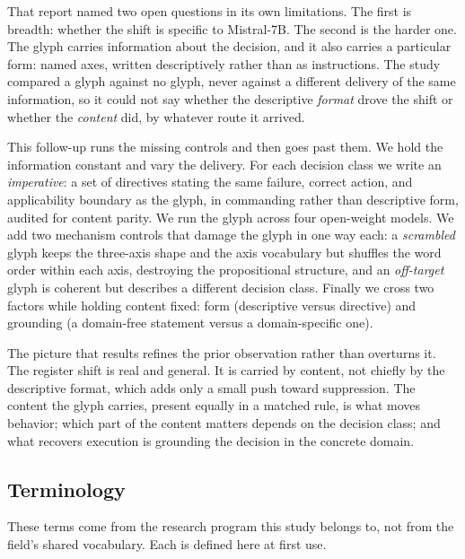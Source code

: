 \documentclass[11pt,a4paper]{article}
\begin{document}
That report named two open questions in its own limitations. The first is breadth:
whether the shift is specific to Mistral-7B. The second is the harder one. The glyph
carries information about the decision, and it also carries a particular form: named
axes, written descriptively rather than as instructions. The study compared a glyph
against no glyph, never against a different delivery of the same information, so it
could not say whether the descriptive \emph{format} drove the shift or whether the
\emph{content} did, by whatever route it arrived.

This follow-up runs the missing controls and then goes past them. We hold the
information constant and vary the delivery. For each decision class we write an
\emph{imperative}: a set of directives stating the same failure, correct action, and
applicability boundary as the glyph, in commanding rather than descriptive form,
audited for content parity. We run the glyph across four open-weight models. We add
two mechanism controls that damage the glyph in one way each: a \emph{scrambled}
glyph keeps the three-axis shape and the axis vocabulary but shuffles the word order
within each axis, destroying the propositional structure, and an \emph{off-target}
glyph is coherent but describes a different decision class. Finally we cross two
factors while holding content fixed: form (descriptive versus directive) and
grounding (a domain-free statement versus a domain-specific one).

The picture that results refines the prior observation rather than overturns it. The
register shift is real and general. It is carried by content, not chiefly by the
descriptive format, which adds only a small push toward suppression.
The content the glyph carries, present equally in a matched rule, is what moves
behavior; which part of the content matters depends on the decision class; and what
recovers execution is grounding the decision in the concrete domain.

\subsection{Terminology}\label{sec:terms}

These terms come from the research program this study belongs to, not from the
field's shared vocabulary. Each is defined here at first use.
\end{document}
